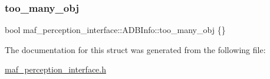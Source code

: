 \subsubsection{\texorpdfstring{too\+\_\+many\+\_\+obj}{too\_many\_obj}}
{\footnotesize\ttfamily bool maf\+\_\+perception\+\_\+interface\+::\+A\+D\+B\+Info\+::too\+\_\+many\+\_\+obj \{\}}



The documentation for this struct was generated from the following file\+:\begin{DoxyCompactItemize}
\item 
\hyperlink{maf__perception__interface_8h}{maf\+\_\+perception\+\_\+interface.\+h}\end{DoxyCompactItemize}
